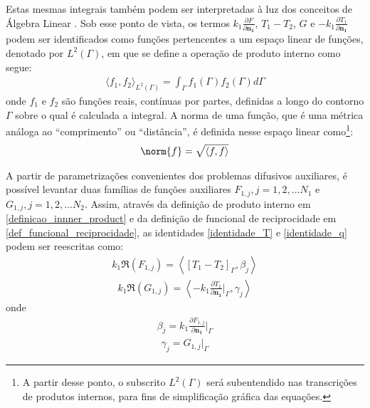 Estas mesmas integrais também podem ser interpretadas à luz dos conceitos de Álgebra Linear \citep{livro_axler}. Sob esse ponto de vista, os termos
$\displaystyle k_1 \frac{\partial F}{\partial\mathbf{n_1}}$, $T_1 - T_2$, $G$ e $\displaystyle-k_1 \frac{\partial T_1}{\partial\mathbf{n_1}}$ podem ser identificados como funções pertencentes a um espaço
linear de funções, denotado por $L^2(\Gamma)$, em que se define a operação de produto interno como segue:
\begin{align}
	\langle f_1, f_2\rangle_{L^2(\Gamma)} = \int_\Gamma f_1(\Gamma) f_2(\Gamma) d\Gamma \label{definicao_innner_product}
\end{align} 
onde $f_1$ e $f_2$ são funções reais, contínuas por partes, definidas a longo do contorno $\Gamma$ sobre o qual é calculada a integral. A norma de uma
função, que é uma métrica análoga ao ``comprimento'' ou ``distância'', é definida nesse espaço linear como\footnote{A partir desse ponto, o subscrito ${L^2(\Gamma)}$ será
subentendido nas transcrições de produtos internos, para fins de simplificação gráfica das equações.}:
\begin{align}
	\norm{f} = \sqrt{\langle f, f\rangle}
\end{align}

A partir de parametrizações convenientes dos problemas difusivos auxiliares, é possível levantar duas famílias de funções auxiliares $F_{1,j}, j=1,2,\ldots N_1$
e $G_{1,j}, j=1,2,\ldots N_2$. Assim, através da definição de produto interno em \eqref{definicao_innner_product} e da definição de funcional de reciprocidade em \eqref{def_funcional_reciprocidade},
as identidades \eqref{identidade_T} e \eqref{identidade_q} podem ser reescritas como:
\begin{align}
	k_1 \Re(F_{1,j})
	=
	\left\langle \left[T_1 - T_2\right]_\Gamma, \beta_j\right\rangle
	\label{identidade_T_inner}
\end{align}
\begin{align}
	k_1 \Re(G_{1,j})
	=
	\left\langle  -k_1 \frac{\partial T_1}{\partial\mathbf{n_1}}\bigg|_\Gamma, \gamma_j\right\rangle
	\label{identidade_q_inner}
\end{align}
onde
\begin{align}
	\beta_j = k_1 \frac{\partial F_{1,j}}{\partial\mathbf{n_1}}\bigg|_\Gamma \label{expressao_define_beta}
\end{align}
\begin{align}
	\gamma_j = G_{1,j}\big|_\Gamma \label{expressao_define_gamma}
\end{align}

